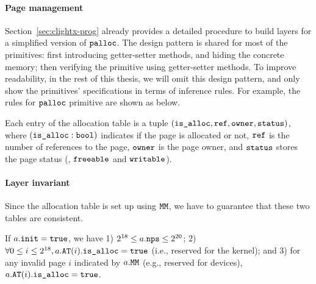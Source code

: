 \paragraph{Page management}
Section~\ref{sec:clightx-prog}
already provides
a detailed procedure
to build layers for a simplified version of
${\texttt{palloc}}$.
The design pattern
is shared for most of the primitives:
first introducing getter-setter methods,
and hiding the concrete memory;
then verifying the primitive using
getter-setter methods.
To improve
readability,
in the rest of this thesis,
we will omit
this design pattern,
and only show the primitives' specifications
in terms of inference rules.
For example,
the rules for ${\texttt{palloc}}$ primitive are shown as below.
Each entry of the allocation table is a tuple
$({\texttt{is\_alloc}}, {\texttt{ref}}, {\texttt{owner}}, {\texttt{status}})$,
where $({\texttt{is\_alloc}}:{\texttt{bool}})$ indicates
if the page is allocated or not,
${\texttt{ref}}$ is the number of references to the page,
${\texttt{owner}}$ is the page owner,
and ${\texttt{status}}$ stores the page status
(\eg, ${\texttt{freeable}}$ and ${\texttt{writable}}$).

\paragraph{Layer invariant}
Since the allocation table is set up using ${\texttt{MM}}$,
we have to guarantee that these two tables
are consistent.
\begin{invariant}
If $a.{\texttt{init}} = {\texttt{true}}$,
we have 
1) $2^{18} \le a.{\texttt{nps}} \le 2^{20}$;
2) $\forall 0 \le i \le 2^{18},  a.{\texttt{AT}}(i).{\texttt{is\_alloc}} = {\texttt{true}}$ (i.e., reserved for the kernel);
and 3) for any invalid page $i$ indicated by $a.{\texttt{MM}}$
(e.g., reserved for devices),
$a.{\texttt{AT}}(i).{\texttt{is\_alloc}} = {\texttt{true}}$.
\end{invariant}

